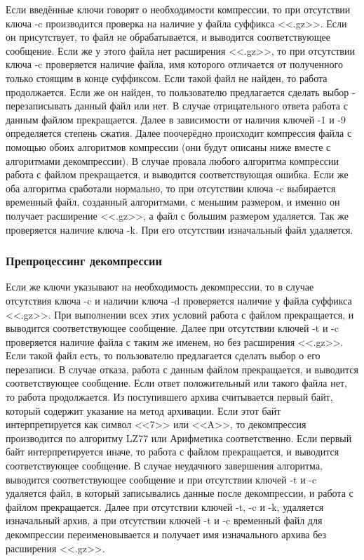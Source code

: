 \documentclass[12pt]{article}
\begin{document}
Если введённые ключи говорят о необходимости компрессии, то при отсутствии ключа -c производится проверка на наличие у файла суффикса <<.gz>>. Если он присутствует, то файл не обрабатывается, и выводится соответствующее сообщение. Если же у этого файла нет расширения <<.gz>>, то при отсутствии ключа -c проверяется наличие файла, имя которого отличается от полученного только стоящим в конце суффиксом. Если такой файл не найден, то работа продолжается. Если же он найден, то пользователю предлагается сделать выбор - перезаписывать данный файл или нет. В случае отрицательного ответа работа с данным файлом прекращается. Далее в зависимости от наличия ключей -1 и -9 определяется степень сжатия. Далее поочерёдно происходит компрессия файла с помощью обоих алгоритмов компрессии (они будут описаны ниже вместе с алгоритмами декомпрессии). В случае провала любого алгоритма компрессии работа с файлом прекращается, и выводится соответствующая ошибка. Если же оба алгоритма сработали нормально, то при отсутствии ключа -c выбирается временный файл, созданный алгоритмами, с меньшим размером, и именно он получает расширение <<.gz>>, а файл с большим размером удаляется. Так же проверяется наличие ключа -k. При его отсутствии изначальный файл удаляется.

\subsubsection*{Препроцессинг декомпрессии}

Если же ключи указывают на необходимость декомпрессии, то в случае отсутствия ключа -c и наличии ключа -d проверяется наличие у файла суффикса <<.gz>>. При выполнении всех этих условий работа с файлом прекращается, и выводится соответствующее сообщение. Далее при отсутствии ключей -t и -c проверяется наличие файла с таким же именем, но без расширения <<.gz>>. Если такой файл есть, то пользователю предлагается сделать выбор о его перезаписи. В случае отказа, работа с данным файлом прекращается, и выводится соответствующее сообщение. Если ответ положительный или такого файла нет, то работа продолжается. Из поступившего архива считывается первый байт, который содержит указание на метод архивации. Если этот байт интерпретируется как символ <<7>> или <<A>>, %
то декомпрессия производится по алгоритму LZ77 или Арифметика соответственно. Если первый байт интерпретируется иначе, то работа с файлом прекращается, и выводится соответствующее сообщение. В случае неудачного завершения алгоритма, выводится соответствующее сообщение и при отсутствии ключей -t и -c удаляется файл, в который записывались данные после декомпрессии, и работа с файлом прекращается. Далее при отсутствии ключей -t, -c и -k, удаляется изначальный архив, а при отсутствии ключей -t и -c временный файл для декомпрессии переименовывается и получает имя изначального архива без расширения <<.gz>>.
\end{document}
